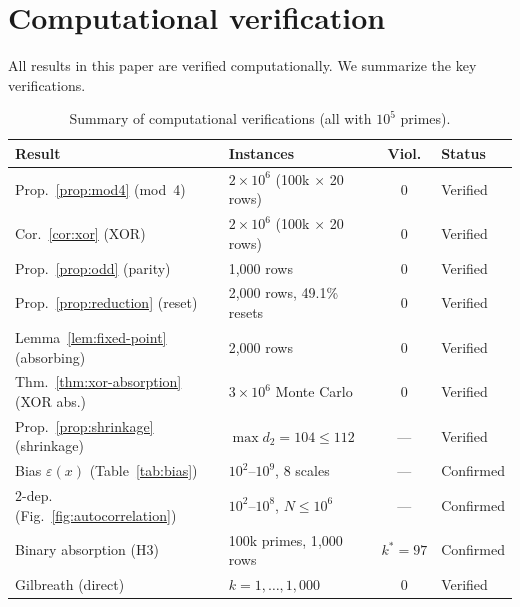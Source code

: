 \documentclass[11pt, a4paper]{amsart}
\theoremstyle{plain}
\theoremstyle{definition}
\begin{document}
\section{Computational verification}
\label{sec:computation}

All results in this paper are verified computationally. We summarize the key verifications.

\begin{table}[h]
\centering
\caption{Summary of computational verifications (all with $10^5$ primes).}\label{tab:verifications}
\small
\begin{tabular}{@{}llcl@{}}
\toprule
Result & Instances & Viol. & Status \\
\midrule
Prop.~\ref{prop:mod4} (mod~4) & $2 \times 10^6$ (100k $\times$ 20 rows) & 0 & Verified \\
Cor.~\ref{cor:xor} (XOR) & $2 \times 10^6$ (100k $\times$ 20 rows) & 0 & Verified \\
Prop.~\ref{prop:odd} (parity) & 1{,}000 rows & 0 & Verified \\
Prop.~\ref{prop:reduction} (reset) & 2{,}000 rows, 49.1\% resets & 0 & Verified \\
Lemma~\ref{lem:fixed-point} (absorbing) & 2{,}000 rows & 0 & Verified \\
Thm.~\ref{thm:xor-absorption} (XOR abs.) & $3 \times 10^6$ Monte Carlo & 0 & Verified \\
Prop.~\ref{prop:shrinkage} (shrinkage) & $\max d_2 = 104 \le 112$ & --- & Verified \\
Bias $\varepsilon(x)$ (Table~\ref{tab:bias}) & $10^2$--$10^9$, 8 scales & --- & Confirmed \\
$2$-dep. (Fig.~\ref{fig:autocorrelation}) & $10^2$--$10^8$, $N \le 10^6$ & --- & Confirmed \\
Binary absorption (H3) & 100k primes, 1{,}000 rows & $k^*\!=\!97$ & Confirmed \\
Gilbreath (direct) & $k = 1, \ldots, 1{,}000$ & 0 & Verified \\
\bottomrule
\end{tabular}
\end{table}
\end{document}
